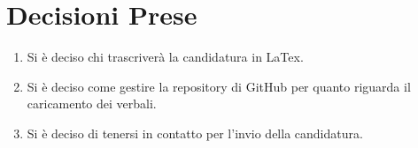 \documentclass{TWReport}
\begin{document}
\section*{Decisioni Prese}
\begin{enumerate}
    \item Si è deciso chi trascriverà la candidatura in LaTex.
    \item Si è deciso come gestire la repository di GitHub per quanto riguarda il caricamento dei verbali.
    \item Si è deciso di tenersi in contatto per l'invio della candidatura.
\end{enumerate}
\end{document}
